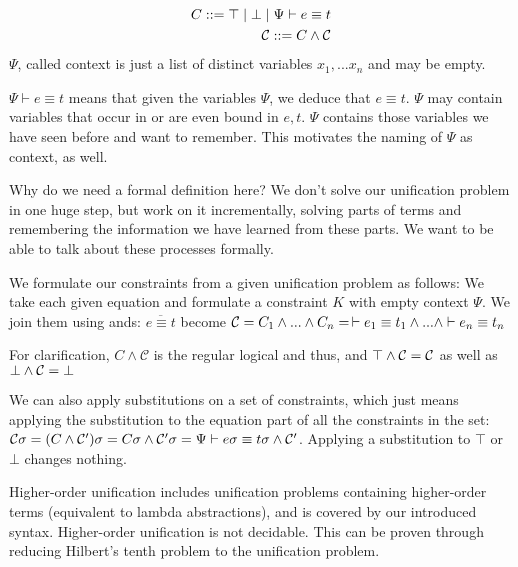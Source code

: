 \documentclass[twoside,12pt,a4paper]{article}
\begin{document}
\begin{definition}[Constraint]
    \begin{align*}
        C ::= \top \;|\; \bot \;|\; \Psi \vdash e\equiv t\\
        \mathcal{C} ::= C \wedge \mathcal{C}
    \end{align*}
    $\Psi$, called context is just a list of distinct variables $x_1,...x_n$ and may be empty.
\end{definition}
$\Psi \vdash e\equiv t$ means that given the variables $\Psi$, we deduce that $e\equiv t$.
$\Psi$ may contain variables that occur in or are even bound in $e,t$. 
$\Psi$ contains those variables we have seen before and want to remember. This motivates the naming of $\Psi$ as context, as well.

Why do we need a formal definition here? We don't solve our unification problem in one huge step, but
work on it incrementally, solving parts of terms and remembering the information we have learned from these parts.
We want to be able to talk about these processes formally.

We formulate our constraints from a given unification problem as follows:
We take each given equation and formulate a constraint $K$ with empty context $\Psi$. We join them using ands: %
$\overline{e\equiv t}$ become $\mathcal{C} = C_1 \wedge ... \wedge C_n = \, \vdash e_1 \equiv t_1 \wedge ...\wedge \vdash e_n \equiv t_n $  

For clarification, $C \wedge \mathcal{C}$ is the regular logical and thus, 
and $\top \wedge \mathcal{C} = \mathcal{C}$ as well as $\bot \wedge \mathcal{C} = \bot$

We can also apply substitutions on a set of constraints, which just means applying the substitution to the equation part of all the constraints in the set:
$\mathcal{C} \sigma = (C \wedge \mathcal{C}')\sigma = C \sigma \wedge \mathcal{C}' \sigma  
= \Psi \vdash e\sigma\equiv t\sigma\wedge \mathcal{C}'$. Applying a substitution to $\top$ or $\bot$ changes nothing.

\begin{theorem}
    Higher-order unification includes unification problems containing higher-order terms (equivalent to lambda abstractions),
    and is covered by our introduced syntax. %
    Higher-order unification is not decidable. This can be proven through reducing Hilbert's tenth problem to the unification problem.
\end{theorem}
\end{document}
